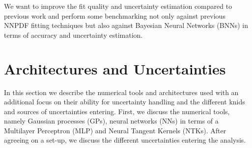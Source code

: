 \documentclass[11pt,a4paper]{article}
\begin{document}
We want to improve the fit quality and uncertainty estimation compared to previous work and perform some benchmarking not only against previous NNPDF fitting techniques but also against Bayesian Neural Networks (BNNs) in terms of accuracy and uncertainty estimation.

%
\section{Architectures and Uncertainties}
\label{sec:setup}
%
In this section we describe the numerical tools and architectures used with an additional focus on their ability for uncertainty handling and the different knids and sources of uncertainties entering. First, we discuss the numerical tools, namely Gaussian processes (GPs), neural networks (NNs) in terms of a Multilayer Perceptron (MLP) and Neural Tangent Kernels (NTKs). After agreeing on a set-up, we discuss the different uncertainties entering the analysis. 
%
\end{document}
